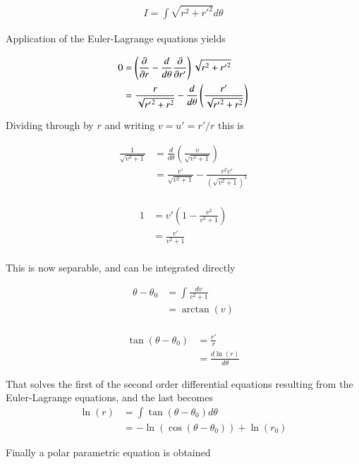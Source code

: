 \begin{align*}
I = \int \sqrt{ r^2 + {r'}^2 } d\theta
\end{align*}
 
Application of the Euler-Lagrange equations yields
 
\begin{align*}
0 
&= \left( \frac{\partial {}}{\partial {r}} - \frac{d}{d\theta} \frac{\partial {}}{\partial {r'}} \right) \sqrt{ r^2 + {r'}^2 }  \\
&= \frac{r}{\sqrt{{r'}^2 + r^2}} - \frac{d}{d\theta} \left( \frac{{r'}}{\sqrt{{r'}^2 + r^2}}\right) \\
\end{align*}
 
Dividing through by $r$ and writing $v = u' = {r'}/r$ this is
 
\begin{align*}
\frac{1}{\sqrt{v^2 + 1}}
&= \frac{d}{d\theta} \left( \frac{v}{\sqrt{v^2 + 1}}\right) \\
&= \frac{v'}{\sqrt{v^2 + 1}} -\frac{v^2 v'}{(\sqrt{v^2 + 1})^3} \\
\end{align*}
 
\begin{align*}
1 
&= v' \left( 1 -\frac{v^2 }{v^2 + 1} \right) \\
&= \frac{v'}{v^2 + 1} \\
\end{align*}

This is now separable, and can be integrated directly

\begin{align*}
\theta - \theta_0
&= \int \frac{dv}{v^2 + 1} \\
&= \arctan(v) \\
\end{align*}
 
\begin{align*}
\tan(\theta - \theta_0)
&= \frac{{r'}}{r} \\
&= \frac{d \ln(r) }{d\theta}
\end{align*}

That solves the first of the second order differential equations resulting from the Euler-Lagrange equations, and the 
last becomes
\begin{align*}
\ln(r) &= \int \tan(\theta - \theta_0) d\theta \\
&= -\ln(\cos(\theta - \theta_0)) + \ln(r_0)
\end{align*}

Finally a polar parametric equation is obtained
 
